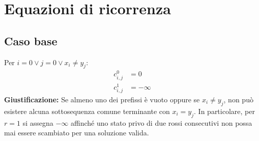 \section{Equazioni di ricorrenza}

\subsection{Caso base}
Per $i = 0 \lor j = 0 \lor x_i \neq y_j$:
\begin{align*}
    c_{i,j}^0 &= 0 \\
    c_{i,j}^1 &= -\infty
\end{align*}
\textbf{Giustificazione:} Se almeno uno dei prefissi è vuoto oppure se $x_i \neq y_j$, non può esistere alcuna sottosequenza comune terminante con $x_i = y_j$. In particolare, per $r = 1$ si assegna $-\infty$ affinché uno stato privo di due rossi consecutivi non possa mai essere scambiato per una soluzione valida.

